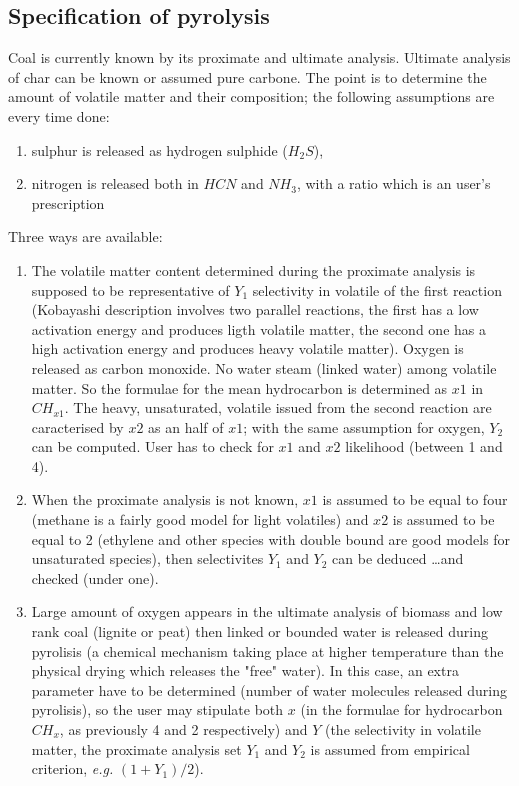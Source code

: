 \subsection{Specification of pyrolysis}

Coal is currently known by its proximate and ultimate analysis. Ultimate analysis of char can be known or assumed pure carbone.
The point is to determine the amount of volatile matter and their composition;
the following assumptions are every time done:
\begin{enumerate}
\item sulphur is released as hydrogen sulphide ($H_{2}S$),
\item nitrogen is released both in $HCN$ and $NH_{3}$, with a ratio which is an user's prescription
\end{enumerate}

Three ways are available:
\begin{enumerate}

\item The volatile matter content determined during the proximate analysis is
  supposed to be representative of $Y_1$ selectivity in volatile of the first
  reaction (Kobayashi description involves two parallel reactions, the first has
  a low activation energy and produces ligth volatile matter, the second one has
  a high activation energy and produces heavy volatile matter). Oxygen is
  released as carbon monoxide. No water steam (linked water) among volatile
  matter. So the formulae for the mean hydrocarbon is determined as $x1$ in
  $CH_{x1}$. The heavy, unsaturated, volatile issued from the second reaction
  are caracterised by $x2$ as an half of $x1$; with the same assumption for
  oxygen, $Y_2$ can be computed. User has to check for $x1$ and $x2$ likelihood
  (between 1 and 4).
\item When the proximate analysis is not known, $x1$ is assumed to be equal to
  four (methane is a fairly good model for light volatiles) and $x2$ is assumed
  to be equal to 2 (ethylene and other species with double bound are good models
  for unsaturated species), then selectivites $Y_1$ and $Y_2$ can be deduced
  \ldots and checked (under one).
\item Large amount of oxygen appears in the ultimate analysis of biomass and low
  rank coal (lignite or peat) then linked or bounded water is released during
  pyrolisis (a chemical mechanism taking place at higher temperature than the
  physical drying which releases the "free" water). In this case, an extra
  parameter have to be determined (number of water molecules released during
  pyrolisis), so the user may stipulate both $x$ (in the formulae for hydrocarbon
  $CH_{x}$, as previously 4 and 2 respectively) and $Y$ (the selectivity in
  volatile matter, the proximate analysis set $Y_1$ and $Y_2$ is assumed from
  empirical criterion, \emph{e.g.} $(1+Y_1)/2$).

\end{enumerate}

